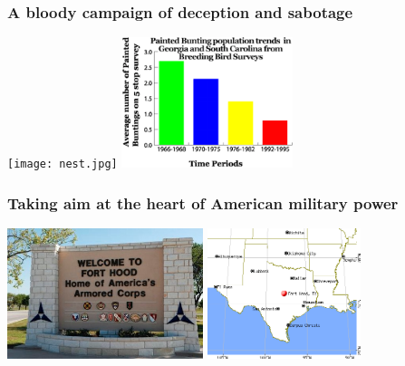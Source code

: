 \documentclass{beamer}
\begin{document}
\begin{frame}
	\frametitle{A bloody campaign of deception and sabotage}
	\begin{center}
		\texttt{[image: nest.jpg]}
		\includegraphics[height=1.5in, keepaspectratio]{trend.png}
	\end{center}
\end{frame}

\begin{frame}
	\frametitle{Taking aim at the heart of American military power}
	\begin{center}
		\includegraphics[height=1.5in, keepaspectratio]{fort.jpg}
		\includegraphics[height=1.5in, keepaspectratio]{map.png}
	\end{center}
\end{frame}
\end{document}
